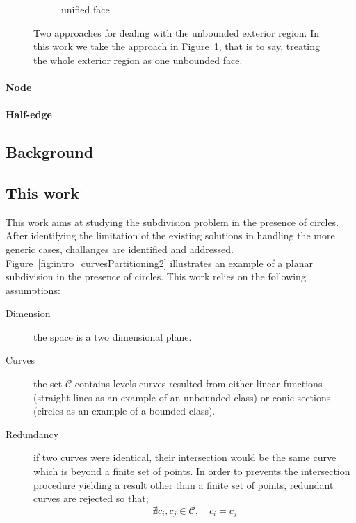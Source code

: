 \begin{figure}
\begin{subfigure}{.32\textwidth}
    \caption{unified face} \label{subfig:intro_unboundedFaces_c}
  \end{subfigure}%
  \caption[xxx]
          {Two approaches for dealing with the unbounded exterior region.
          In this work we take the approach in Figure~\ref{subfig:intro_unboundedFaces_c}, that is to say, treating the whole exterior region as one unbounded face.}
  \label{fig:intro_unboundedFaces}
\end{figure}

\paragraph{Node}
\td{}
\paragraph{Half-edge}
\td{}

\subsection{Background}


\subsection{This work}

This work aims at studying the subdivision problem in the presence of circles.
After identifying the limitation of the existing solutions in handling the more generic cases, challanges are identified and addressed.
Figure~\ref{fig:intro_curvesPartitioning2} illustrates an example of a planar subdivision in the presence of circles.
This work relies on the following assumptions:
\begin{description}
\item [Dimension] the space is a two dimensional plane.
\item [Curves] the set $\mathcal{C}$ contains levels curves resulted from either linear functions (straight lines as an example of an unbounded class) or conic sections (circles as an example of a bounded class).
\item [Redundancy] if two curves were identical, their intersection would be the same curve which is beyond a finite set of points.
  In order to prevents the intersection procedure yielding a result other than a finite set of points, redundant curves are rejected so that;
  \[ \nexists c_i , c_j \in \mathcal{C}, \quad c_i = c_j \]
\end{description}

